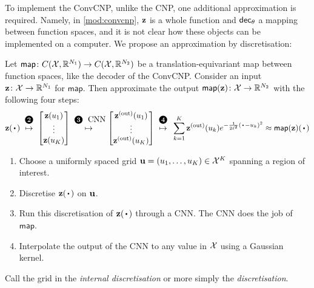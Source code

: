 \documentclass[12pt]{report}
\begin{document}
To implement the ConvCNP, unlike the CNP, one additional approximation is required.
Namely, in \cref{mod:convcnp}, $\mathbf{z}$ is a whole function and $\mathsf{dec}_\theta$ a mapping between function spaces, and it is not clear how these objects can be implemented on a computer.
We propose an approximation by discretisation:

\begin{procedure}[Discretisation]
    \label{proc:discretisation}
    Let $\mathsf{map}\colon C(\mathcal{X}, \mathbb{R}^{N_1}) \to C(\mathcal{X}, \mathbb{R}^{N_2})$ be a translation-equivariant map between function spaces,
    like the decoder of the ConvCNP.
    Consider an input $\mathbf{z}\colon \mathcal{X} \to \mathbb{R}^{N_1}$ for $\mathsf{map}$. 
    Then approximate the output $\mathsf{map}(\mathbf{z}) \colon \mathcal{X} \to \mathbb{R}^{N_2}$ with the following four steps:
    \begin{equation*}
        \vz(\vardot)
        \overset{\raisebox{5pt}{\ballnumber{2}}}{\mapsto}
        \begin{bmatrix}
            \vz(u_1) \\
            \vdots \\
            \vz(u_K) 
        \end{bmatrix}
        \overset{\raisebox{5pt}{\ballnumber{3} \text{\normalshape CNN}}}{\mapsto}
        \begin{bmatrix}
            \vz\us{(out)}(u_1) \\
            \vdots \\
            \vz\us{(out)}(u_K) 
        \end{bmatrix}
        \overset{\raisebox{5pt}{\ballnumber{4}}}{\mapsto}
        \vphantom{
            \begin{bmatrix}
                \vz \\ \vdots \\ \vz
            \end{bmatrix}
        }
        \sum_{k=1}^K \vz\us{(out)}(u_k) e^{-\frac{1}{2\ell^2}(\vardot - u_k)^2}
        \approx
        \mathsf{map}(\vz)(\vardot)
    \end{equation*}
    \begin{enumerate}
        \item[\ballnumber{1}]
            Choose a uniformly spaced grid $\mathbf{u} = (u_1, \ldots, u_K) \in \mathcal{X}^K$ spanning a region of interest.
        \item[\ballnumber{2}]
            Discretise $\vz(\vardot)$ on $\mathbf{u}$.
        \item[\ballnumber{3}]
            Run this discretisation of $\vz(\vardot)$ through a CNN.
            The CNN does the job of $\mathsf{map}$.
        \item[\ballnumber{4}]
            Interpolate the output of the CNN to any value in $\mathcal{X}$ using a Gaussian kernel.
    \end{enumerate}
    Call the grid in  the \emph{internal discretisation} or more simply the \emph{discretisation}.
\end{procedure}
\end{document}
